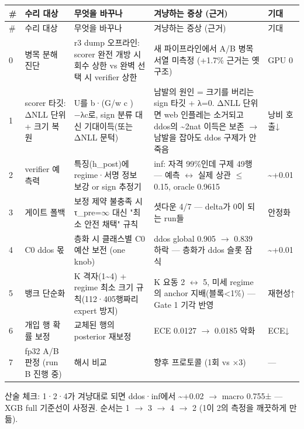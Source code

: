 \endgroup
\begingroup
\footnotesize
\begin{longtable}{>{\raggedright\arraybackslash}p{}>{\raggedright\arraybackslash}p{}>{\raggedright\arraybackslash}p{}>{\raggedright\arraybackslash}p{}>{\raggedright\arraybackslash}p{}}
\toprule
\# & 수리 대상 & 무엇을 바꾸나 & 겨냥하는 증상 (근거) & 기대 \\ \midrule
\endfirsthead
\# & 수리 대상 & 무엇을 바꾸나 & 겨냥하는 증상 (근거) & 기대 \\ \midrule
\endhead
{}0 & 병목 분해 진단 & r3 dump 오프라인: scorer 완전 개방 시 회수 상한 vs 완벽 선택 시 verifier 상한 & 새 파이프라인에서 A/\allowbreak{}B 병목 서열 미측정 (+\allowbreak{}1.7\% 근거는 옛 구조) & GPU 0 \\
{}1 & scorer 타깃: ΔNLL 단위 +\allowbreak{} 크기 복원 & U를 b·(G/\allowbreak{}w c )−λc로, sign 분류 대신 기대이득(또는 ΔNLL 문턱) & 남발의 원인 =\allowbreak{} 크기를 버리는 sign 타깃 +\allowbreak{} λ=\allowbreak{}0. ΔNLL 단위면 web 인플레는 소거되고 ddos의 \textasciitilde{}2nat 이득은 보존  \ensuremath{\rightarrow}  남발을 잡아도 ddos 구제가 안 죽음 & 낭비 호출↓ \\
{}2 & verifier 예측력 & 특징(h\_\allowbreak{}post)에 regime·서명 정보 보강 or sign 추정기 & inf: 자격 99\%인데 구제 49행 — 예측 \ensuremath{\leftrightarrow} 실제 상관 \ensuremath{\leq}0.15, oracle 0.9615 & \textasciitilde{}+\allowbreak{}0.01 \\
{}3 & 게이트 폴백 & 보정 제약 불충족 시 τ\_\allowbreak{}pre=\allowbreak{}\ensuremath{\infty} 대신 "최소 안전 채택" 규칙 & 셧다운 4/\allowbreak{}7 — delta가 0이 되는 run들 & 안정화 \\
{}4 & C0 ddos 몫 & 층화 시 클래스별 C0 예산 보전 (one knob) & ddos global 0.905 \ensuremath{\rightarrow} 0.839 하락 — 층화가 ddos 슬롯 잠식 & \textasciitilde{}+\allowbreak{}0.01 \\
{}5 & 뱅크 단순화 & K 격자(1\textasciitilde{}4) +\allowbreak{} regime 최소 크기 규칙(112·405행짜리 expert 방지) & K 요동 2 \ensuremath{\leftrightarrow} 5, 미세 regime의 anchor 지배(블록<1\%) — Gate 1 기각 반영 & 재현성↑ \\
{}6 & 개입 행 확률 보정 & 교체된 행의 posterior 재보정 & ECE 0.0127 \ensuremath{\rightarrow} 0.0185 악화 & ECE↓ \\
{}7 & fp32 A/\allowbreak{}B 판정 (run B 진행 중) & 해시 비교 & 향후 프로토콜 (1회 vs ×3) & — \\
\bottomrule
\end{longtable}
\endgroup
산술 체크: 1·2·4가 겨냥대로 되면 ddos·inf에서 \textasciitilde{}+\allowbreak{}0.02  \ensuremath{\rightarrow}  macro 0.755± — XGB full 기준선이 사정권. 순서는 1 \ensuremath{\rightarrow} 3 \ensuremath{\rightarrow} 4 \ensuremath{\rightarrow} 2 (1이 2의 측정을 깨끗하게 만듦).

